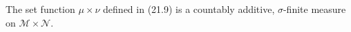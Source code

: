The set function $\mu \times \nu$ defined in (21.9) is a countably additive, $\sigma$-finite measure on $\mathcal{M} \times \mathcal{N}$.
